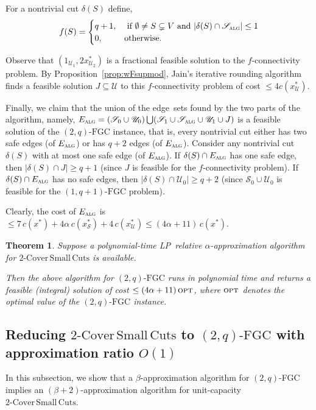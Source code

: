 \documentclass[11pt]{article}
\newtheorem{theorem}{Theorem}
\newcommand{\opt}{\textsc{opt}}
\newcommand{\safe}{\mathscr{S}}
\newcommand{\unsafe}{\mathscr{U}}
\newcommand{\fgc}{\mathrm{FGC}}
\newcommand{\oneqplusfgc}{(1,q+1)\text{-}\fgc}
\newcommand{\J}{{J}}
\newcommand{\alg}{\textsc{alg}}
\newcommand{\twoqfgc}{(2,q)\text{-}\fgc}
\newcommand\twoASC{\mathrm{2\text{-}Cover\,Small\,Cuts}}
\begin{document}
{{For a nontrivial cut $\delta(S)$ define,
\[
f(S) = \begin{cases}
    q+1, &\text{ if } \emptyset\neq{S}\subsetneq{V} \text{ and } |\delta(S)\cap \safe_{\alg}| \leq 1 \\
	0, &\text{otherwise}.
\end{cases}
\]

Observe that $(1_{\unsafe_1}, 2x^*_{\unsafe_2})$ is a fractional
feasible solution to the $f$-connectivity problem.
By Proposition~\ref{prop:wFsupmod}, Jain's iterative rounding
algorithm finds a feasible solution $\J\subseteq{\unsafe}$
to this $f$-connectivity problem of cost $\leq 4c(x^*_{\unsafe})$.


Finally, we claim that the union of the edge~sets found by the two
parts of the algorithm, namely, $E_{\alg}=(\safe_0\cup\unsafe_0)
\bigcup (\safe_1\cup\safe_{\alg}\cup\unsafe_1\cup{\J})$ is a feasible
solution of the $\twoqfgc$ instance, that is, every nontrivial cut
either has two safe edges (of $E_{\alg}$) or has $q+2$ edges (of $E_{\alg}$).
Consider any nontrivial cut $\delta(S)$ with at most one safe edge (of $E_{\alg}$).
If $\delta(S)\cap{E_{\alg}}$ has one safe edge, then $|\delta(S)\cap{\J}|\geq{q+1}$
(since $\J$ is feasible for the $f$-connectivity problem).
If $\delta(S)\cap{E_{\alg}}$ has no safe edges, then $|\delta(S)\cap{\unsafe_0}|\geq{q+2}$
(since $\safe_0\cup\unsafe_0$ is feasible for the $\oneqplusfgc$ problem).

Clearly, the cost of $E_{\alg}$ is $\leq 7\, c(x^*) + 4\alpha\,
c(x^*_{\safe}) + 4\, c(x^*_{\unsafe}) \leq (4\alpha+11)\, c(x^*)$.


{
\begin{theorem} \label{thm:approx-twoqfgc}
Suppose a polynomial-time LP~relative $\alpha$-approximation algorithm
for $\twoASC$ is available.

Then the above algorithm for $\twoqfgc$ runs in polynomial time and
returns a feasible (integral) solution of cost $\leq (4\alpha+11)\, \opt$,
where $\opt$ denotes the optimal value of the $\twoqfgc$ instance.
\end{theorem}
}

}


\medskip

\subsection*{Reducing $\twoASC$ to $\twoqfgc$ with approximation ratio $O(1)$}
{
In this subsection, we show that a $\beta$-approximation algorithm
for $(2,q)$-FGC implies an $(\beta+2)$-approximation algorithm for
unit-capacity $\twoASC$. 

}}
\end{document}
